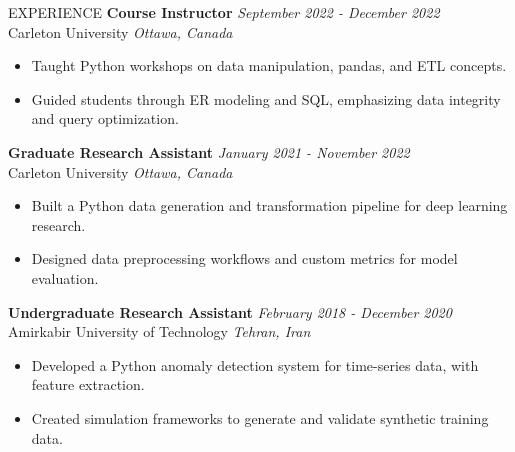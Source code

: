 \documentclass{resume}
\begin{document}
\begin{rSection}{EXPERIENCE}
\textbf{Course Instructor} \hfill \textit{September 2022 - December 2022}\\
Carleton University \hfill \textit{Ottawa, Canada}
 \begin{itemize}
    \itemsep -3pt {}
    \item Taught Python workshops on data manipulation, pandas, and ETL concepts.
    \item Guided students through ER modeling and SQL, emphasizing data integrity and query optimization.
 \end{itemize}

\textbf{Graduate Research Assistant} \hfill \textit{January 2021 - November 2022}\\
Carleton University \hfill \textit{Ottawa, Canada}
 \begin{itemize}
    \itemsep -3pt {}
    \item Built a Python data generation and transformation pipeline for deep learning research.
    \item Designed data preprocessing workflows and custom metrics for model evaluation.
 \end{itemize}

\textbf{Undergraduate Research Assistant} \hfill \textit{February 2018 - December 2020}\\
Amirkabir University of Technology \hfill \textit{Tehran, Iran}
 \begin{itemize}
    \itemsep -3pt {}
    \item Developed a Python anomaly detection system for time-series data, with feature extraction.
    \item Created simulation frameworks to generate and validate synthetic training data.
 \end{itemize}

\end{rSection}
\end{document}
